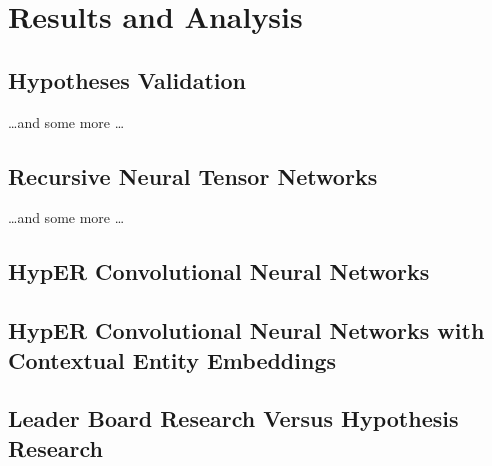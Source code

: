 
\chapter{Results and Analysis}  %

\ifpdf
    \graphicspath{{Chapter1/Figs/Raster/}{Chapter1/Figs/PDF/}{Chapter1/Figs/}}
\else
    \graphicspath{{Chapter1/Figs/Vector/}{Chapter1/Figs/}}
\fi


\section{Hypotheses Validation}
\dots and some more \dots

\section{Recursive Neural Tensor Networks}
\dots and some more \dots


\section{HypER Convolutional Neural Networks}

\section{HypER Convolutional Neural Networks with Contextual Entity Embeddings}

\section{Leader Board Research Versus Hypothesis Research}

